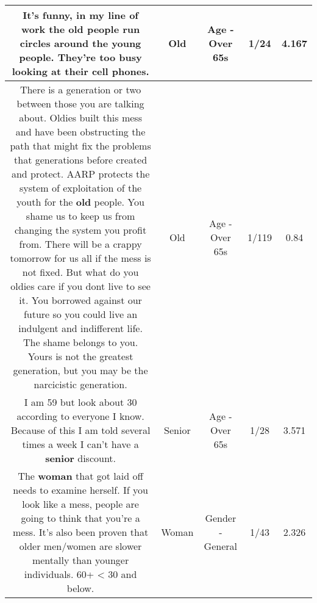 \documentclass[11pt]{article}
\newlength\mylength
\begin{document}
\begin{center}
\begin{longtable}{|C{.65\mylength}|C{.30\mylength}|C{.12\mylength}|C{.12\mylength}|C{.12\mylength}|}
  \small It's funny, in my line of work the \textbf{old} people run circles around the young people.  They're too busy looking at their cell phones.\normalsize   & Old & Age - Over 65s & 1/24 & 4.167 \\  \hline
  \small There is a generation or two between those you are talking about. Oldies built this mess and have been obstructing the path that might fix the problems that generations before created and protect. AARP protects the system of exploitation of the youth for the \textbf{old} people. You shame us to keep us from changing the system you profit from. There will be a crappy tomorrow for us all if the mess is not fixed. But what do you oldies care if you dont live to see it. You borrowed against our future so you could live an indulgent and indifferent life. The shame belongs to you. Yours is not the greatest generation, but you may be the narcicistic generation.\normalsize   & Old & Age - Over 65s & 1/119 & 0.84 \\  \hline
  \small I am 59 but look about 30 according to everyone I know. Because of this I am told several times a week I can't have a \textbf{senior} discount.\normalsize   & Senior & Age - Over 65s & 1/28 & 3.571 \\  \hline
  \small The \textbf{woman} that got laid off needs to examine herself. If you look like a mess, people are going to think that you're a mess. It's also been proven that older men/women are slower mentally than younger individuals. 60+ < 30 and below.\normalsize   & Woman & Gender - General & 1/43 & 2.326 \\  \hline

\end{longtable}
\end{center}
\end{document}
